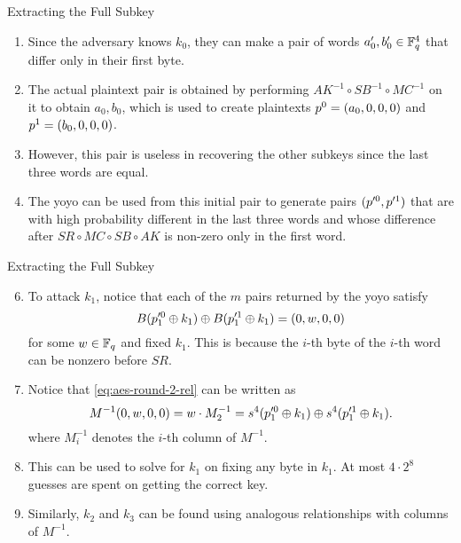\documentclass[notheorems]{beamer}
\theoremstyle{definition}
\theoremstyle{example}
\begin{document}
    \begin{frame}[<+->]{Extracting the Full Subkey}
        \begin{enumerate}
            \item Since the adversary knows \(k_0\), they can make a pair of
            words \(a_0^\prime, b_0^\prime \in \mathbb F_q^4\) that differ only in
            their first byte. 
            \item The actual plaintext pair is obtained by performing \(AK^{-1}
            \circ SB^{-1} \circ MC^{-1}\) on it to obtain \(a_0, b_0\), which is
            used to create plaintexts \(p^0 = (a_0, 0, 0, 0)\) and \(p^1 =
            (b_0, 0, 0, 0)\). 
            \item However, this pair is useless in recovering the other subkeys
            since the last three words are equal. 
            \item The yoyo can be used from this initial pair to generate pairs
            \((p^{\prime 0}, p^{\prime 1})\) that are with high probability
            different in the last three words and whose difference after \(SR
            \circ MC \circ SB \circ AK\) is non-zero only in the first word. 
        \end{enumerate}
    \end{frame}

    \begin{frame}[<+->]{Extracting the Full Subkey}
        \begin{enumerate}\setcounter{enumi}{5}
            \item To attack \(k_1\), notice that each of the \(m\) pairs
            returned by the yoyo satisfy
            \begin{equation}
                B(p_1^{\prime 0} \oplus k_1) \oplus B(p_1^{\prime 1} \oplus k_1) = (0, w, 0, 0)
                \label{eq:aes-round-2-rel}
            \end{equation}
            for some \(w \in \mathbb F_q\) and fixed \(k_1\). This is because
            the \(i\)-th byte of the \(i\)-th word can be nonzero before \(SR\).
            \item Notice that \eqref{eq:aes-round-2-rel} can be written as
            \begin{equation}
                M^{-1}(0, w, 0, 0) = w \cdot M_2^{-1} = s^4(p_1^{\prime 0} \oplus k_1) \oplus s^4(p_1^{\prime 1} \oplus k_1).
            \end{equation}
            where \(M_i^{-1}\) denotes the \(i\)-th column of \(M^{-1}\). 
            \item This can be used to solve for \(k_1\) on fixing any byte in
            \(k_1\). At most \(4 \cdot 2^8\) guesses are spent on getting
            the correct key.
            \item Similarly, \(k_2\) and \(k_3\) can be found using analogous
            relationships with columns of \(M^{-1}\).
        \end{enumerate}
    \end{frame}
\end{document}
